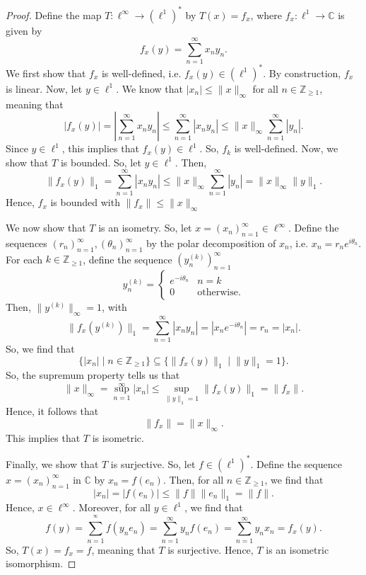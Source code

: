 \documentclass[a4paper, openany]{memoir}
\theoremstyle{definition}
\theoremstyle{plain}
\begin{document}
    \begin{proof}
        Define the map $T \colon \ell^\infty \to (\ell^1)^*$ by $T(x) = f_x$, where $f_x \colon \ell^1 \to \mathbb{C}$ is given by 
        \[f_x(y) = \sum_{n=1}^\infty x_n y_n.\]
        We first show that $f_x$ is well-defined, i.e. $f_x(y) \in (\ell^1)^*$. By construction, $f_x$ is linear. Now, let $y \in \ell^1$. We know that $|x_n| \leq \lVert x \rVert_\infty$ for all $n \in \mathbb{Z}_{\geq 1}$, meaning that
        \[|f_x(y)| = \left| \sum_{n=1}^\infty x_n y_n \right| \leq \sum_{n=1}^{\infty} |x_n y_n| \leq \lVert x \rVert_\infty \sum_{n=1}^\infty |y_n|.\]
        Since $y \in \ell^1$, this implies that $f_x(y) \in \ell^1$. So, $f_k$ is well-defined. Now, we show that $T$ is bounded. So, let $y \in \ell^1$. Then,
        \[\lVert f_x(y) \rVert_1 = \sum_{n=1}^\infty |x_n y_n| \leq \lVert x \rVert_\infty \sum_{n=1}^\infty |y_n| = \lVert x \rVert_\infty \lVert y \rVert_1.\]
        Hence, $f_x$ is bounded with $\lVert f_x \rVert \leq \lVert x \rVert_\infty$

        We now show that $T$ is an isometry. So, let $x = (x_n)_{n=1}^\infty \in \ell^\infty$. Define the sequences $(r_n)_{n=1}^\infty, (\theta_n)_{n=1}^\infty$ by the polar decomposition of $x_n$, i.e. $x_n = r_n e^{i \theta_n}$. For each $k \in \mathbb{Z}_{\geq 1}$, define the sequence $(y^{(k)}_n)_{n=1}^\infty$
        \[y^{(k)}_n = \begin{cases}
            e^{-i\theta_n} & n = k \\
            0 & \textrm{otherwise}.
        \end{cases}\]
        Then, $\lVert y^{(k)} \rVert_\infty = 1$, with
        \[\lVert f_x(y^{(k)}) \rVert_1 = \sum_{n=1}^\infty |x_n y_n| = |x_n e^{-i \theta_n}| = r_n = |x_n|.\]
        So, we find that 
        \[\{|x_n| \mid n \in \mathbb{Z}_{\geq 1}\} \subseteq \{\lVert f_x(y) \rVert_1 \mid \lVert y \rVert_1 = 1\}.\]
        So, the supremum property tells us that 
        \[\lVert x \rVert_\infty = \sup_{n = 1}^\infty |x_n| \leq \sup_{\lVert y \rVert_1 = 1} \lVert f_x(y) \rVert_1 = \lVert f_x \rVert.\]
        Hence, it follows that 
        \[\lVert f_x \rVert = \lVert x \rVert_\infty.\]
        This implies that $T$ is isometric.

        Finally, we show that $T$ is surjective. So, let $f \in (\ell^1)^*$. Define the sequence $x = (x_n)_{n=1}^\infty$ in $\mathbb{C}$ by $x_n = f(e_n)$. Then, for all $n \in \mathbb{Z}_{\geq 1}$, we find that 
        \[|x_n| = |f(e_n)| \leq \lVert f \rVert \lVert e_n \rVert_1 = \lVert f \rVert.\]
        Hence, $x \in \ell^\infty$. Moreover, for all $y \in \ell^1$, we find that
        \[f(y) = \sum_{n=1}^{^\infty} f(y_n e_n) = \sum_{n=1}^{\infty} y_n f(e_n) = \sum_{n=1}^{\infty} y_n x_n = f_x(y).\]
        So, $T(x) = f_x = f$, meaning that $T$ is surjective. Hence, $T$ is an isometric isomorphism.
    \end{proof}
    \newpage
\end{document}

